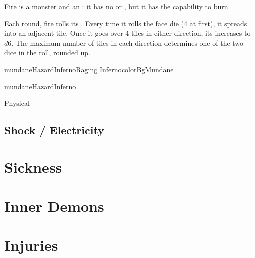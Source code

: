 Fire is a monster and an : it has no  or ,
but it has the capability to burn.


Each round, fire rolls its . Every time it rolls the face die (4 at first),
it spreads into an adjacent tile.
Once it goes over 4 tiles in either direction, its  increases to $d6$.
The maximum number of tiles in each direction determines one of the two dice in the  roll, rounded up.
\\




\begin{actorCardMiniAmerican}{mundaneHazardInferno}{Raging Inferno}{colorBgMundane}
	\begin{capabilitiesBox}{mundaneHazardInferno}
		\begin{capabilitiesTable}{Physical}
		\end{capabilitiesTable}
	\end{capabilitiesBox}
\end{actorCardMiniAmerican}





\subsection{Shock / Electricity}




\section{Sickness}

\section{Inner Demons}

\section{Injuries}

